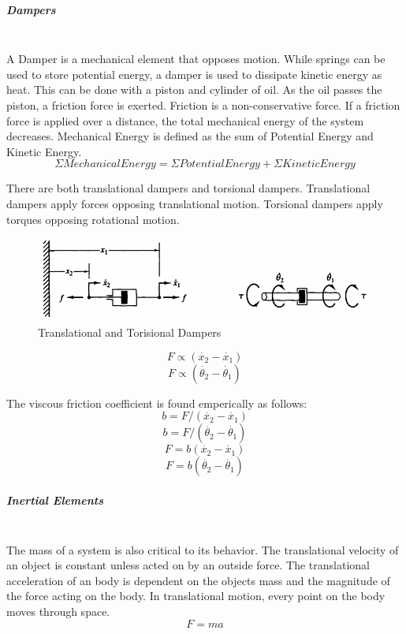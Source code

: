 \documentclass[paper=a4, fontsize=11pt]{scrartcl} %
\numberwithin{equation}{section} %
\numberwithin{figure}{section} %
\numberwithin{table}{section} %
\begin{document}
\subparagraph{Dampers}~ \\
A Damper is a mechanical element that opposes motion. While springs can be used to store potential energy, a damper is used to dissipate kinetic energy as heat. This can be done with a piston and cylinder of oil. As the oil passes the piston, a friction force is exerted. Friction is a non-conservative force. If a friction force is applied over a distance, the total mechanical energy of the system decreases. Mechanical Energy is defined as the sum of Potential Energy and Kinetic Energy. \\

$$\Sigma Mechanical Energy = \Sigma Potential Energy + \Sigma Kinetic Energy$$

There are both translational dampers and torsional dampers. Translational dampers apply forces opposing translational motion. Torsional dampers apply torques opposing rotational motion. \\

\begin{figure}
  \includegraphics[width=\linewidth]{Damper.png}
  \caption{Translational and Torisional Dampers}
  \label{fig:boat1}
\end{figure}

$$F \propto (\dot{x_2} - \dot{x_1})$$
$$F \propto (\dot{\theta_2} - \dot{\theta_1})$$

The viscous friction coefficient is found emperically as follows: 
$$b = F/ (\dot{x_2} - \dot{x_1})$$
$$b = F/ (\dot{\theta_2} - \dot{\theta_1})$$
$$F = b(\dot{x_2} - \dot{x_1})$$
$$F = b(\dot{\theta_2} - \dot{\theta_1})$$

\subparagraph{Inertial Elements}~ \\
The mass of a system is also critical to its behavior. The translational velocity of an object is constant unless acted on by an outside force. The translational acceleration of an body is dependent on the objects mass and the magnitude of the force acting on the body. In translational motion, every point on the body moves through space. \\

$$F = ma$$
\end{document}
